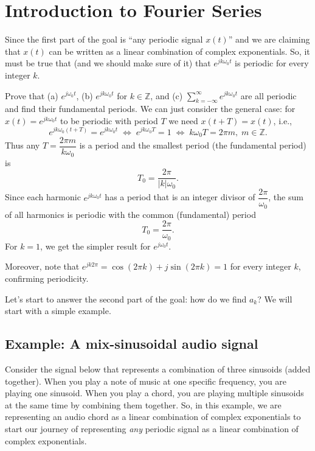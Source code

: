 \documentclass{ee102_notes}
\begin{document}
\section{Introduction to Fourier Series}
Since the first part of the goal is ``any periodic signal $x(t)$'' and we are claiming that $x(t)$ can be written as a linear combination of complex exponentials. So, it must be true that (and we should make sure of it) that $e^{jk\omega_0 t}$ is periodic for every integer $k$.
\begin{popquiz}
Prove that (a) $e^{j\omega_0 t}$, (b) $e^{jk\omega_0 t}$ for $k \in \mathbb{Z}$, and (c) $\displaystyle\sum_{k=-\infty}^{\infty} e^{jk\omega_0 t}$ are all periodic and find their fundamental periods.
\popqsplit
We can just consider the general case: for $x(t) = e^{jk\omega_0 t}$ to be periodic with period $T$ we need
$x(t+T)=x(t)$, i.e.,
\[
e^{jk\omega_0 (t+T)}=e^{jk\omega_0 t}
\;\Longleftrightarrow\;
e^{jk\omega_0 T}=1 
\;\Longleftrightarrow\; k\omega_0 T=2\pi m,\; m\in\mathbb{Z}.
\]
Thus any $T=\dfrac{2\pi m}{k\omega_0}$ is a period and the smallest period (the fundamental period) is
\[
T_0=\frac{2\pi}{|k|\omega_0}.
\]
Since each harmonic $e^{jk\omega_0 t}$ has a period that is an integer divisor of $\dfrac{2\pi}{\omega_0}$, the sum of all harmonics is periodic with the common (fundamental) period
\[
T_0=\frac{2\pi}{\omega_0}.
\]
For $k=1$, we get the simpler result for $e^{j\omega_0 t}$.

Moreover, note that $e^{jk 2\pi}= \cos(2\pi k)+j\sin(2\pi k)=1$ for every integer $k$, confirming periodicity.
\end{popquiz}

Let's start to answer the second part of the goal: how do we find $a_k$? We will start with a simple example.
\subsection{Example: A mix-sinusoidal audio signal}
Consider the signal below that represents a combination of three sinusoids (added together). When you play a note of music at one specific frequency, you are playing one sinusoid. When you play a chord, you are playing multiple sinusoids at the same time by combining them together. So, in this example, we are representing an audio chord as a linear combination of complex exponentials to start our journey of representing \emph{any} periodic signal as a linear combination of complex exponentials.
\end{document}
